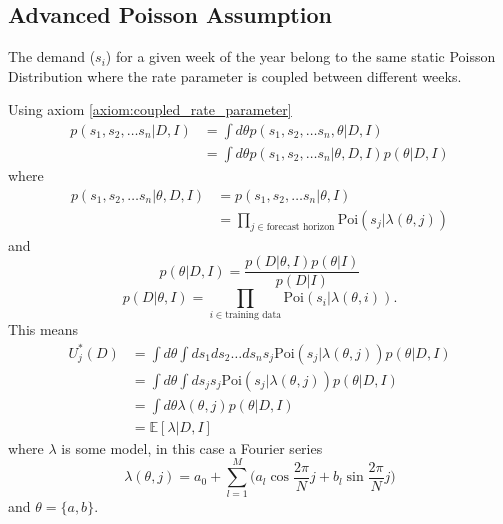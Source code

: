 \subsection{Advanced Poisson Assumption}

\begin{axiom}
	\label{axiom:coupled_rate_parameter}
	The demand ($s_i$) for a given week of the year belong to the same static Poisson Distribution where the rate parameter is coupled between different weeks.
\end{axiom}

Using axiom \ref{axiom:coupled_rate_parameter}
\begin{equation}
	\begin{split}
		p(s_1,s_2,\dots s_n| D,I) &= \int d\theta p(s_1,s_2,\dots s_n,\theta|D,I)\\
		& = \int d\theta p(s_1,s_2,\dots s_n|\theta,D,I)p(\theta|D,I)
	\end{split}
\end{equation}
where
\begin{equation}
	\begin{split}
		p(s_1,s_2,\dots s_n|\theta,D,I) &= p(s_1,s_2,\dots s_n|\theta,I)\\
		& = \prod_{j\in \text{forecast horizon}}\text{Poi}(s_j|\lambda(\theta,j))
	\end{split}
\end{equation}
and
\begin{equation}
	p(\theta|D,I) = \frac{p(D|\theta,I)p(\theta|I)}{p(D|I)}
\end{equation}
\begin{equation}
	p(D|\theta,I) = \prod_{i\in \text{training data}} \text{Poi}(s_i|\lambda(\theta,i)).
\end{equation}
This means
\begin{equation}
		 \begin{split}
		 	U^*_j(D) &= \int d\theta\int ds_1ds_2\dots ds_n s_j\text{Poi}(s_j|\lambda(\theta,j))p(\theta|D,I)\\
		 	& = \int d\theta \int ds_js_j \text{Poi}(s_j|\lambda(\theta,j))p(\theta|D,I)\\
		 	& = \int d\theta \lambda(\theta,j) p(\theta|D,I)\\
		 	& = \mathbb{E}[\lambda|D,I]
		 \end{split}
		\label{eq:decision_rule3}
\end{equation}
where $\lambda$ is some model, in this case a Fourier series
\begin{equation}
	\lambda(\theta,j) = a_0+\sum_{l=1}^{M}\bigg(a_l\cos\frac{2\pi}{N}j+b_l\sin\frac{2\pi}{N}j\bigg)
\end{equation}
and $\theta=\{a,b\}$.

